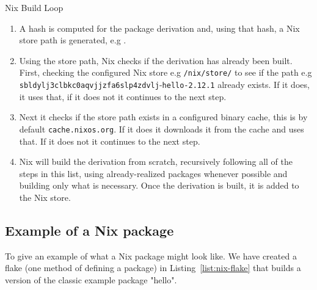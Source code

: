 \begin{figureBox}[label = {fig:nix-derivation-loop}, width=0.8\linewidth]{Nix Build Loop}
  { \footnotesize
  \begin{enumerate}
    \item A hash is computed for the package derivation and, using that hash, a Nix store path is generated, e.g .
    \item  Using the store path, Nix checks if the derivation has already been built. First, checking the configured Nix store e.g {\color{Purple}\texttt{/nix/store/}} to see if the path e.g {\color{RoyalBlue}\texttt{sbldylj3clbkc0aqvjjzfa6slp4zdvlj}}-{\color{Orange}\texttt{hello-2.12.1}} already exists. If it does, it uses that, if it does not it continues to the next step.
    \item Next it checks if the store path exists in a configured binary cache, this is by default \texttt{cache.nixos.org}. If it does it downloads it from the cache and uses that. If it does not it continues to the next step.
    \item Nix will build the derivation from scratch, recursively following all of the steps in this list, using already-realized packages whenever possible and building only what is necessary. Once the derivation is built, it is added to the Nix store.
  \end{enumerate}
  }
\end{figureBox}

\subsection{Example of a Nix package}

To give an example of what a Nix package might look like. We have created a flake (one method of defining a package) in Listing~\ref{list:nix-flake} that builds a version of the classic example package "hello". 


